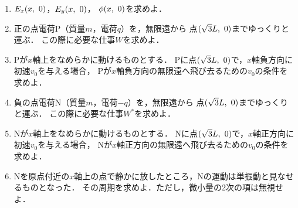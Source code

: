 \documentclass[fleqn,head_space=14mm,foot_space=15mm,gutter=10mm,fore_edge=10mm,
    twocolumn,jafontscale=0.92]{jlreq}
\begin{document}
\begin{enumerate}

    \item $E_x(x, \hspace{1.2mm} 0)$，$E_y(x, \hspace{1.2mm} 0)$，
    $\phi(x, \hspace{1.2mm} 0)$を求めよ．

    \item 正の点電荷P（質量$m$，電荷$q$）を，無限遠から
    点$(\sqrt{3}L, \hspace{1.2mm} 0)$までゆっくりと運ぶ．
    この際に必要な仕事$W$を求めよ．

    \item Pが$x$軸上をなめらかに動けるものとする．
    Pに点$(\sqrt{3}L, \hspace{1.2mm} 0)$で，$x$軸負方向に初速$v_0$を与える場合，
    Pが$x$軸負方向の無限遠へ飛び去るための$v_0$の条件を求めよ．

    \item 負の点電荷N（質量$m$，電荷$-q$）を，無限遠から
    点$(\sqrt{3}L, \hspace{1.2mm} 0)$までゆっくりと運ぶ．
    この際に必要な仕事$W^*$を求めよ．

    \item Nが$x$軸上をなめらかに動けるものとする．
    Nに点$(\sqrt{3}L, \hspace{1.2mm} 0)$で，$x$軸正方向に初速$v_0$を与える場合，
    Nが$x$軸正方向の無限遠へ飛び去るための$v_0$の条件を求めよ．

    \item Nを原点付近の$x$軸上の点で静かに放したところ，Nの運動は単振動と見なせるものとなった．
    その周期を求めよ．ただし，微小量の2次の項は無視せよ．

\end{enumerate}

\vspace{2cm}
\vfill
\end{document}
